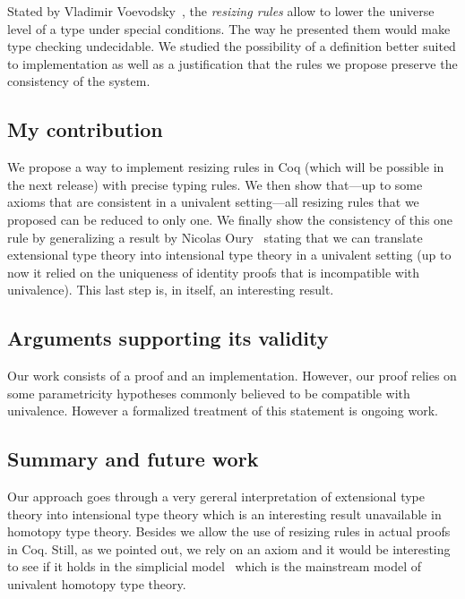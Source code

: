 \documentclass[11pt]{article}
\theoremstyle{plain}
\theoremstyle{remark}
\begin{document}
Stated by Vladimir Voevodsky~\cite{vv:resizing}, the \emph{resizing rules} allow
to lower the universe level of a type under special conditions. The way he
presented them would make type checking undecidable.
We studied the possibility of a definition better suited to implementation
as well as a justification that the rules we propose preserve the consistency
of the system.

\subsection*{My contribution}

We propose a way to implement resizing rules in Coq (which will be possible in
the next release) with precise typing rules.
We then show that---up to some axioms that are consistent in a univalent
setting---all resizing rules that we proposed %
can be reduced to only one.
We finally show the consistency of this one rule by generalizing a result by
Nicolas Oury~\cite{oury2005extensionality} stating that we can translate
extensional type theory into intensional type theory in a univalent setting
(up to now it relied on the uniqueness of identity proofs that is incompatible
with univalence).
This last step is, in itself, an interesting result.

\subsection*{Arguments supporting its validity}

Our work consists of a proof and an implementation.
However, our proof relies on some parametricity hypotheses commonly believed to
be compatible with univalence. However a formalized treatment of this statement
is ongoing work.


\subsection*{Summary and future work}

Our approach goes through a very gereral interpretation of extensional type
theory into intensional type theory which is an interesting result unavailable
in homotopy type theory. Besides we allow the use of resizing rules in actual
proofs in Coq.
Still, as we pointed out, we rely on an axiom and it would be interesting to
see if it holds in the simplicial model~\cite{kapulkin2012simplicial} which is
the mainstream model of univalent homotopy type theory.
\end{document}

